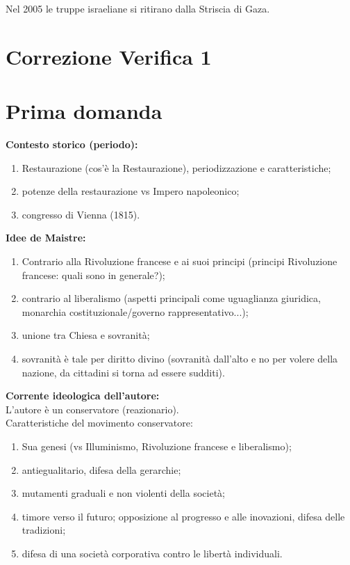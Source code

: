 \documentclass[a4paper]{article}
\begin{document}
Nel 2005 le truppe israeliane si ritirano dalla Striscia di Gaza.

\pagebreak

\section{Correzione Verifica 1}

\section{Prima domanda}

\textbf{Contesto storico (periodo):}
\begin{enumerate}
    \item Restaurazione (cos'è la Restaurazione), periodizzazione e caratteristiche;
    \item potenze della restaurazione vs Impero napoleonico;
    \item congresso di Vienna (1815).
\end{enumerate}

\textbf{Idee de Maistre:}
\begin{enumerate}
    \item Contrario alla Rivoluzione francese e ai suoi principi (principi Rivoluzione francese: quali sono in generale?);
    \item contrario al liberalismo (aspetti principali come uguaglianza giuridica, monarchia costituzionale/governo rappresentativo...);
    \item unione tra Chiesa e sovranità;
    \item sovranità è tale per diritto divino (sovranità dall'alto e no per volere della nazione, da cittadini si torna ad essere sudditi).
\end{enumerate}

\textbf{Corrente ideologica dell'autore:} \\
L'autore è un conservatore (reazionario). \\
Caratteristiche del movimento conservatore:
\begin{enumerate}
    \item Sua genesi (vs Illuminismo, Rivoluzione francese e liberalismo);
    \item antiegualitario, difesa della gerarchie;
    \item mutamenti graduali e non violenti della società;
    \item timore verso il futuro; opposizione al progresso e alle inovazioni, difesa delle tradizioni;
    \item difesa di una società corporativa contro le libertà individuali.
\end{enumerate}
\end{document}
